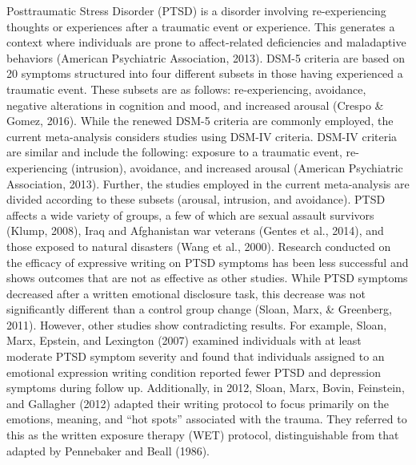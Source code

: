 \documentclass[english,man, mask]{apa6}
\theoremstyle{definition}
\theoremstyle{definition}
\theoremstyle{definition}
\theoremstyle{remark}
\begin{document}
Posttraumatic Stress Disorder (PTSD) is a disorder involving
re-experiencing thoughts or experiences after a traumatic event or
experience. This generates a context where individuals are prone to
affect-related deficiencies and maladaptive behaviors (American
Psychiatric Association, 2013). DSM-5 criteria are based on 20 symptoms
structured into four different subsets in those having experienced a
traumatic event. These subsets are as follows: re-experiencing,
avoidance, negative alterations in cognition and mood, and increased
arousal (Crespo \& Gomez, 2016). While the renewed DSM-5 criteria are
commonly employed, the current meta-analysis considers studies using
DSM-IV criteria. DSM-IV criteria are similar and include the following:
exposure to a traumatic event, re-experiencing (intrusion), avoidance,
and increased arousal (American Psychiatric Association, 2013). Further,
the studies employed in the current meta-analysis are divided according
to these subsets (arousal, intrusion, and avoidance). PTSD affects a
wide variety of groups, a few of which are sexual assault survivors
(Klump, 2008), Iraq and Afghanistan war veterans (Gentes et al., 2014),
and those exposed to natural disasters (Wang et al., 2000). Research
conducted on the efficacy of expressive writing on PTSD symptoms has
been less successful and shows outcomes that are not as effective as
other studies. While PTSD symptoms decreased after a written emotional
disclosure task, this decrease was not significantly different than a
control group change (Sloan, Marx, \& Greenberg, 2011). However, other
studies show contradicting results. For example, Sloan, Marx, Epstein,
and Lexington (2007) examined individuals with at least moderate PTSD
symptom severity and found that individuals assigned to an emotional
expression writing condition reported fewer PTSD and depression symptoms
during follow up. Additionally, in 2012, Sloan, Marx, Bovin, Feinstein,
and Gallagher (2012) adapted their writing protocol to focus primarily
on the emotions, meaning, and \enquote{hot spots} associated with the
trauma. They referred to this as the written exposure therapy (WET)
protocol, distinguishable from that adapted by Pennebaker and Beall
(1986).
\end{document}
